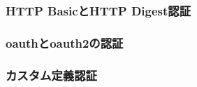 
\subsubsection{HTTP BasicとHTTP Digest認証}

\subsubsection{oauthとoauth2の認証}

\subsubsection{カスタム定義認証}

